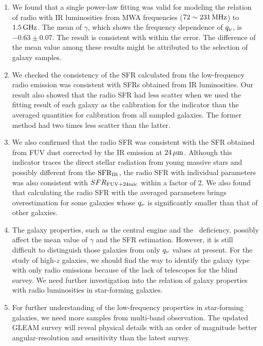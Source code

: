 \begin{enumerate}
    \item We found that a single power-law fitting was valid for modeling the relation of radio with IR luminosities from MWA frequencies ($72\sim231\,\mathrm{MHz}$) to $1.5\,\mathrm{GHz}$.
        The mean of $\gamma$, which shows the frequency dependence of $q_{\nu}$, is $-0.63\pm0.07$.
        The result is consistent with \citet{CalistroRivera2017a, Chyzy2018} within the error.
        The difference of the mean value among these results might be attributed to the selection of galaxy samples.
    \item We checked the consistency of the SFR calculated from the low-frequency radio emission was consistent with SFRs obtained from IR luminosities.
        Our result also showed that the radio SFR had less scatter when we used the fitting result of each galaxy as the calibration for the indicator than the averaged quantities for calibration from all sampled galaxies.
        The former method had two times less scatter than the latter.
    \item We also confirmed that the radio SFR was consistent with the SFR obtained from FUV dust corrected by the IR emission at $24\,\mathrm{\mu m}$.
        Although this indicator traces the direct stellar radiation from young massive stars and possibly different from the $\mathrm{SFR}_{\mathrm{IR}}$, the radio SFR with individual parameters was also consistent with $SFR_{\mathrm{FUV+24mic}}$ within a factor of 2.
        We also found that calculating the radio SFR with the averaged parameters brings overestimation for some galaxies whose $q_{\nu}$ is significantly smaller than that of other galaxies.
    \item The galaxy properties, such as the central engine and the \nh~deficiency, possibly affect the mean value of $\gamma$ and the SFR estimation.
        However, it is still difficult to distinguish those galaxies from only $q_{\nu}$ values at present.
        For the study of high-$z$ galaxies, we should find the way to identify the galaxy type with only radio emissions because of the lack of telescopes for the blind survey.
        We need further investigation into the relation of galaxy properties with radio luminosities in star-forming galaxies.
    \item For further understanding of the low-frequency properties in star-forming galaxies, we need more samples from multi-band observation.
        The updated GLEAM survey will reveal physical details with an order of magnitude better angular-resolution and sensitivity than the latest survey.
\end{enumerate}


